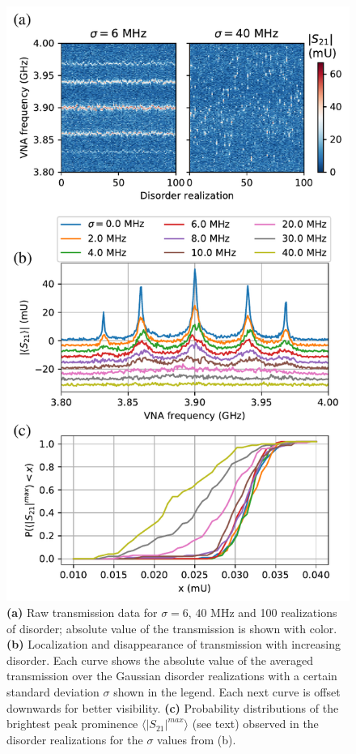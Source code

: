 \documentclass[%
 aps, prl,
 amsmath,amssymb,
 reprint,%
superscriptaddress
]{revtex4-2}
\begin{document}
\begin{figure}
	\includegraphics[width=1\linewidth]{Pictures/mbl}
	\caption{\textbf{(a)} Raw transmission data for $\sigma = 6,\, 40$ MHz and 100 realizations of disorder; absolute value of the transmission is shown with color. \textbf{(b)} Localization and disappearance of transmission with increasing disorder. Each curve shows the absolute value of the averaged transmission over the Gaussian disorder realizations with a certain standard deviation $\sigma$ shown in the legend. Each next curve is offset downwards for better visibility. \textbf{(c)} Probability distributions of the brightest peak prominence $\langle |S_{21}|^{max}\rangle$ (see text) observed in the disorder realizations for the $\sigma$ values from (b).}
	\label{fig:mbl}
\end{figure}
\end{document}
